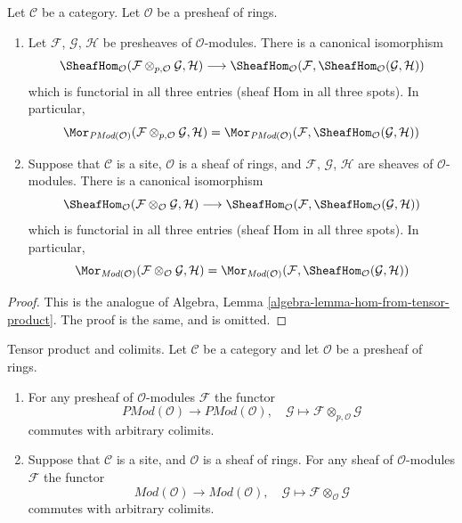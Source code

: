 \begin{lemma}
\label{lemma-internal-hom-adjoint-tensor}
Let $\mathcal{C}$ be a category. Let $\mathcal{O}$ be a presheaf of
rings.
\begin{enumerate}
\item Let $\mathcal{F}$, $\mathcal{G}$, $\mathcal{H}$ be
presheaves of $\mathcal{O}$-modules. There is a canonical isomorphism
$$
\SheafHom_\mathcal{O}
(\mathcal{F} \otimes_{p, \mathcal{O}} \mathcal{G}, \mathcal{H})
\longrightarrow
\SheafHom_\mathcal{O}
(\mathcal{F}, \SheafHom_\mathcal{O}(\mathcal{G}, \mathcal{H}))
$$
which is functorial in all three entries (sheaf Hom in
all three spots). In particular,
$$
\Mor_{\textit{PMod}(\mathcal{O})}(
\mathcal{F} \otimes_{p, \mathcal{O}} \mathcal{G}, \mathcal{H})
=
\Mor_{\textit{PMod}(\mathcal{O})}(
\mathcal{F}, \SheafHom_\mathcal{O}(\mathcal{G}, \mathcal{H}))
$$
\item
Suppose that $\mathcal{C}$ is a site, $\mathcal{O}$ is a sheaf of rings,
and $\mathcal{F}$, $\mathcal{G}$, $\mathcal{H}$ are sheaves of
$\mathcal{O}$-modules. There is a canonical isomorphism
$$
\SheafHom_\mathcal{O}
(\mathcal{F} \otimes_\mathcal{O} \mathcal{G}, \mathcal{H})
\longrightarrow
\SheafHom_\mathcal{O}
(\mathcal{F}, \SheafHom_\mathcal{O}(\mathcal{G}, \mathcal{H}))
$$
which is functorial in all three entries (sheaf Hom in
all three spots). In particular,
$$
\Mor_{\textit{Mod}(\mathcal{O})}(
\mathcal{F} \otimes_\mathcal{O} \mathcal{G}, \mathcal{H})
=
\Mor_{\textit{Mod}(\mathcal{O})}(
\mathcal{F}, \SheafHom_\mathcal{O}(\mathcal{G}, \mathcal{H}))
$$
\end{enumerate}
\end{lemma}

\begin{proof}
This is the analogue of
Algebra, Lemma \ref{algebra-lemma-hom-from-tensor-product}.
The proof is the same, and is omitted.
\end{proof}

\begin{lemma}
\label{lemma-tensor-commute-colimits}
Tensor product and colimits.
Let $\mathcal{C}$ be a category and let $\mathcal{O}$ be a presheaf of rings.
\begin{enumerate}
\item For any presheaf of $\mathcal{O}$-modules $\mathcal{F}$ the functor
$$
\textit{PMod}(\mathcal{O}) \longrightarrow \textit{PMod}(\mathcal{O})
, \quad
\mathcal{G} \longmapsto \mathcal{F} \otimes_{p, \mathcal{O}} \mathcal{G}
$$
commutes with arbitrary colimits.
\item
Suppose that $\mathcal{C}$ is a site, and $\mathcal{O}$ is a sheaf of rings.
For any sheaf of $\mathcal{O}$-modules $\mathcal{F}$ the functor
$$
\textit{Mod}(\mathcal{O}) \longrightarrow \textit{Mod}(\mathcal{O})
, \quad
\mathcal{G} \longmapsto \mathcal{F} \otimes_\mathcal{O} \mathcal{G}
$$
commutes with arbitrary colimits.
\end{enumerate}
\end{lemma}

